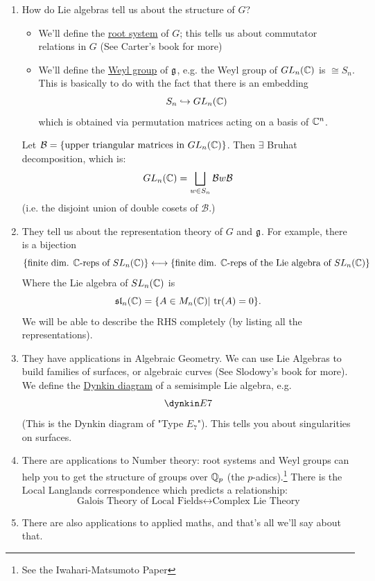 \documentclass{article}
\begin{document}
\begin{enumerate}
    \item[(a)] How do Lie algebras tell us about the structure of $G$?
    \begin{itemize}
        \item We'll define the \underline{root system} of $G$; this tells us about commutator relations in $G$ (See Carter's book for more)
        \item We'll define the \underline{Weyl group} of $\mathfrak{g}$, e.g. the Weyl group of $GL_{n}(\mathbb{C})$ is $\cong S_{n}$. This is basically to do with the fact that there is an embedding
        \[ S_{n} \hookrightarrow GL_{n}(\mathbb{C})\] which is obtained via permutation matrices acting on a basis of $\mathbb{C}^{n}$.
    \end{itemize}
    Let $\mathcal{B} = \{ \text{upper triangular matrices in } GL_{n}(\mathbb{C}) \}$. Then $\exists$ Bruhat decomposition, which is: \[ GL_{n}(\mathbb{C}) = \bigsqcup_{w \in S_{n}} \mathcal{B}w\mathcal{B}\]
    (i.e. the disjoint union of double cosets of $\mathcal{B}$.)
    \item[(b)] They tell us about the representation theory of $G$ and $\mathfrak{g}$. For example, there is a bijection \[ \{\text{finite dim. } \mathbb{C}\text{-reps of } SL_{n}(\mathbb{C})\} \longleftrightarrow \{\text{finite dim. } \mathbb{C}\text{-reps of the Lie algebra of } SL_{n}(\mathbb{C})\}\] Where the Lie algebra of $SL_{n}(\mathbb{C})$ is
    \[ \mathfrak{sl}_{n}(\mathbb{C}) = \{A \in M_{n}(\mathbb{C})| \, \tr(A)=0 \}. \]
    We will be able to describe the RHS completely (by listing all the representations).
    \item[(c)] They have applications in Algebraic Geometry. We can use Lie Algebras to build families of surfaces, or algebraic curves (See Slodowy's book for more).\gap
    We define the \underline{Dynkin diagram} of a semisimple Lie algebra, e.g.\[
    \dynkin E7 \]
    (This is the Dynkin diagram of "Type $E_{7}$"). This tells you about singularities on surfaces.
    \item[(d)] There are applications to Number theory: root systems and Weyl groups can help you to get the structure of groups over $\mathbb{Q}_{p}$ (the $p$-adics).\footnote{See the Iwahari-Matsumoto Paper} \gap
    There is the Local Langlands correspondence which predicts a relationship:
    \[ \text{Galois Theory of Local Fields} \longleftrightarrow \text{Complex Lie Theory} \]
    \item[(e)] There are also applications to applied maths, and that's all we'll say about that.
\end{enumerate}
\end{document}
